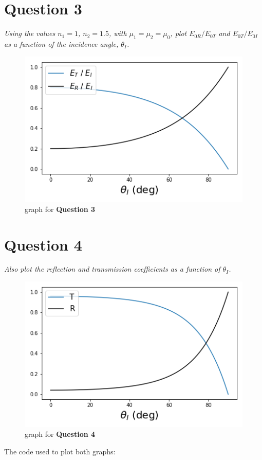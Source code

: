 \documentclass[12pt]{article}
\begin{document}
\section*{Question 3}
\emph{Using the values $n_1 = 1$, $n_2 = 1.5$, with $\mu_1 = \mu_2 = \mu_0$, plot $E_{0R}/E_{0T}$ and $E_{0T}/E_{0I}$ as a function of the incidence angle, $\theta_I$.}
\begin{figure}[ht]
\includegraphics[scale=1]{./phsx425_hw11_3.png}
\caption{graph for \textbf{Question 3}}
\end{figure}

\section*{Question 4}
\emph{Also plot the reflection and transmission coefficients as a function of $\theta_I$.}
\begin{figure}[ht]
\includegraphics[scale=1]{./phsx425_hw11_4.png}
\caption{graph for \textbf{Question 4}}
\end{figure}

\clearpage 
\noindent
The code used to plot both graphs:\bigskip
\end{document}
